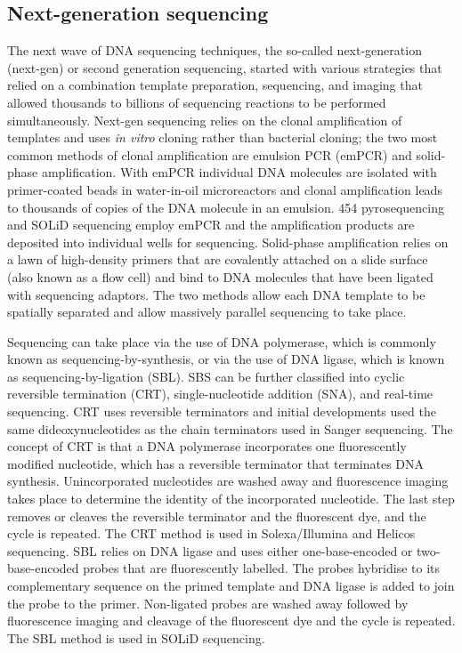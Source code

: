 \subsection{Next-generation sequencing}

The next wave of DNA sequencing techniques, the so-called next-generation (next-gen) or second generation sequencing, started with various strategies that relied on a combination template preparation, sequencing, and imaging that allowed thousands to billions of sequencing reactions to be performed simultaneously\cite{pmid19997069}. Next-gen sequencing relies on the clonal amplification of templates and uses \textit{in vitro} cloning rather than bacterial cloning; the two most common methods of clonal amplification are emulsion PCR (emPCR)\cite{pmid12857956} and solid-phase amplification\cite{pmid16473845}. With emPCR individual DNA molecules are isolated with primer-coated beads in water-in-oil microreactors and clonal amplification leads to thousands of copies of the DNA molecule in an emulsion. 454 pyrosequencing and SOLiD sequencing employ emPCR and the amplification products are deposited into individual wells for sequencing. Solid-phase amplification relies on a lawn of high-density primers that are covalently attached on a slide surface (also known as a flow cell) and bind to DNA molecules that have been ligated with sequencing adaptors. The two methods allow each DNA template to be spatially separated and allow massively parallel sequencing to take place.

Sequencing can take place via the use of DNA polymerase, which is commonly known as sequencing-by-synthesis, or via the use of DNA ligase, which is known as sequencing-by-ligation (SBL). SBS can be further classified into cyclic reversible termination (CRT), single-nucleotide addition (SNA), and real-time sequencing\cite{pmid19997069}. CRT uses reversible terminators and initial developments used the same dideoxynucleotides as the chain terminators used in Sanger sequencing. The concept of CRT is that a DNA polymerase incorporates one fluorescently modified nucleotide, which has a reversible terminator that terminates DNA synthesis. Unincorporated nucleotides are washed away and fluorescence imaging takes place to determine the identity of the incorporated nucleotide. The last step removes or cleaves the reversible terminator and the fluorescent dye, and the cycle is repeated. The CRT method is used in Solexa/Illumina and Helicos sequencing. SBL relies on DNA ligase and uses either one-base-encoded or two-base-encoded probes that are fluorescently labelled. The probes hybridise to its complementary sequence on the primed template and DNA ligase is added to join the probe to the primer. Non-ligated probes are washed away followed by fluorescence imaging and cleavage of the fluorescent dye and the cycle is repeated. The SBL method is used in SOLiD sequencing.

